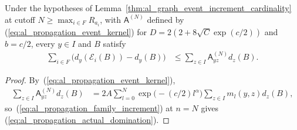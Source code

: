 \begin{lemma}
    \label{thm:al_actual_channel_kernel_domination}
    \leanok
    Under the hypotheses of
    Lemma~\ref{thm:al_graph_event_increment_cardinality} at cutoff
    $N\ge\max_{i\in F}R_{a_i}$, with $\mathsf A^{(N)}$ defined by
    (\ref{eq:al_propagation_event_kernel}) for
    $D=2(2+8\sqrt C\exp(c/2))$ and $b=c/2$, every $y\in I$ and $B$ satisfy
    \begin{align}
        \label{eq:al_propagation_actual_domination}
        \sum_{i\in F}\bigl(d_y(\mathcal E_i(B))-d_y(B)\bigr)
         & \le\sum_{z\in I}\mathsf A^{(N)}_{yz}d_z(B).
    \end{align}
\end{lemma}
\begin{proof}
    \leanok
    By~(\ref{eq:al_propagation_event_kernel}),
    \begin{align}
        \label{eq:al_propagation_actual_reorder}
        \sum_{z\in I}\mathsf A^{(N)}_{yz}d_z(B)
         & =2A\sum_{l=0}^{N}\exp\bigl(-(c/2)l^\alpha\bigr)
        \sum_{z\in I}m_l(y,z)d_z(B),
    \end{align}
    so~(\ref{eq:al_propagation_family_increment}) at $n=N$ gives
    (\ref{eq:al_propagation_actual_domination}).
\end{proof}

